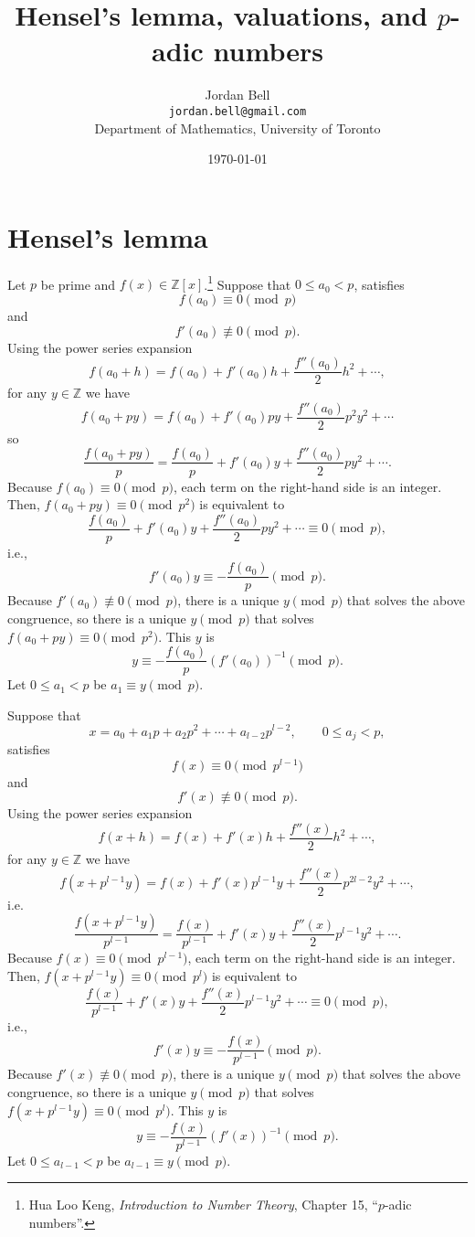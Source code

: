 \documentclass{article}
\theoremstyle{definition}
\begin{document}
\title{Hensel's lemma, valuations, and $p$-adic numbers}
\author{Jordan Bell\\ \texttt{jordan.bell@gmail.com}\\Department of Mathematics, University of Toronto}
\date{\today}

\maketitle

\section{Hensel's lemma}
Let $p$ be prime and $f(x) \in \mathbb{Z}[x]$.\footnote{Hua Loo Keng, {\em Introduction to Number Theory}, Chapter 15, ``$p$-adic numbers''.}
 Suppose that $0 \leq a_0 < p$, satisfies
\[
f(a_0) \equiv 0 \pmod{p}
\]
 and
 \[
 f'(a_0) \not \equiv 0 \pmod{p}.
 \] 
Using the power series expansion
\[
f(a_0+h) = f(a_0)+f'(a_0)h + \frac{f''(a_0)}{2}h^2+\cdots,
\]
 for any $y \in \mathbb{Z}$ we have
 \[
f(a_0+py) = f(a_0)+f'(a_0)py+\frac{f''(a_0)}{2}p^2 y^2 + \cdots
 \]
so
\[
\frac{f(a_0+py)}{p} = \frac{f(a_0)}{p}+f'(a_0)y+\frac{f''(a_0)}{2}p y^2 + \cdots.
\]
Because $f(a_0) \equiv 0 \pmod{p}$, each term on the right-hand side is an integer. 
Then, $f(a_0+py) \equiv 0 \pmod{p^2}$ is equivalent to
\[
\frac{f(a_0)}{p}+f'(a_0)y+\frac{f''(a_0)}{2}p y^2 + \cdots \equiv 0 \pmod{p},
\]
i.e.,
\[
f'(a_0)y \equiv -\frac{f(a_0)}{p} \pmod{p}.
\]
Because $f'(a_0) \not \equiv 0 \pmod{p}$, there is a unique $y \pmod{p}$ that solves the above congruence, 
so there is a unique $y \pmod{p}$ that solves $f(a_0+py) \equiv 0 \pmod{p^2}$. 
This $y$ is 
\[
y \equiv -\frac{f(a_0)}{p} (f'(a_0))^{-1} \pmod{p}.
\]
Let $0 \leq a_1 < p$ be $a_1 \equiv y \pmod{p}$. 

Suppose that 
\[
x=a_0+a_1p+a_2p^2+\cdots+a_{l-2}p^{l-2}, \qquad
0 \leq a_j < p,
\]
satisfies
\[
f(x) \equiv 0 \pmod{p^{l-1}}
\]
and
\[
f'(x) \not \equiv 0 \pmod{p}.
\]
Using the power series expansion
\[
f(x+h)=f(x)+f'(x)h+\frac{f''(x)}{2}h^2+\cdots,
\]
for any $y \in \mathbb{Z}$ we have
\[
f(x+p^{l-1}y) = f(x)+f'(x)p^{l-1}y+\frac{f''(x)}{2}p^{2l-2} y^2 + \cdots,
\]
i.e.
\[
\frac{f(x+p^{l-1}y)}{p^{l-1}} = \frac{f(x)}{p^{l-1}}+f'(x)y+\frac{f''(x)}{2}p^{l-1}y^2+\cdots.
\]
Because $f(x) \equiv 0 \pmod{p^{l-1}}$, each term on the right-hand side is an integer. Then, 
$f(x+p^{l-1}y) \equiv 0 \pmod{p^l}$ is equivalent to
\[
 \frac{f(x)}{p^{l-1}}+f'(x)y+\frac{f''(x)}{2}p^{l-1}y^2+\cdots \equiv 0 \pmod{p},
\]
i.e.,
\[
f'(x)y \equiv - \frac{f(x)}{p^{l-1}} \pmod{p}.
\]
Because $f'(x) \not \equiv 0 \pmod{p}$, there is a unique $y \pmod{p}$ that solves the above congruence, so there
is a unique $y \pmod{p}$ that solves $f(x+p^{l-1}y) \equiv 0 \pmod{p^l}$. This $y$ is
\[
y \equiv - \frac{f(x)}{p^{l-1}} (f'(x))^{-1} \pmod{p}.
\]
Let $0 \leq a_{l-1} < p$ be $a_{l-1} \equiv y \pmod{p}$. 
\end{document}
